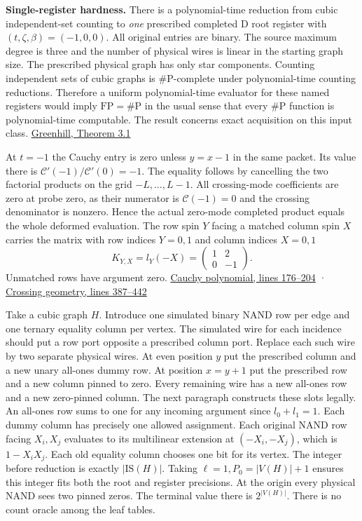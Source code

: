 \documentclass[
  11pt,
]{article}
\begin{document}
\textbf{Single-register hardness.} There is a polynomial-time reduction
from cubic independent-set counting to \emph{one} prescribed completed D
root register with \((t,\zeta,\beta)=(-1,0,0)\). All original entries
are binary. The source maximum degree is three and the number of
physical wires is linear in the starting graph size. The prescribed
physical graph has only star components. Counting independent sets of
cubic graphs is \(\#\mathrm P\)-complete under polynomial-time counting
reductions. Therefore a uniform polynomial-time evaluator for these
named registers would imply \(\mathrm{FP}=\#\mathrm P\) in the usual
sense that every \(\#\mathrm P\) function is polynomial-time computable.
The result concerns exact acquisition on this input class.
\href{https://web.maths.unsw.edu.au/~csg/papers/complexity.pdf}{Greenhill,
Theorem 3.1}

At \(t=-1\) the Cauchy entry is zero unless \(y=x-1\) in the same
packet. Its value there is \(\mathcal C'(-1)/\mathcal C'(0)=-1\). The
equality follows by cancelling the two factorial products on the grid
\(-L,\ldots,L-1\). All crossing-mode coefficients are zero at probe
zero, as their numerator is \(\mathcal C(-1)=0\) and the crossing
denominator is nonzero. Hence the actual zero-mode completed product
equals the whole deformed evaluation. The row spin \(Y\) facing a
matched column spin \(X\) carries the matrix with row indices \(Y=0,1\)
and column indices \(X=0,1\) \[
             K_{Y,X}=l_Y(-X)=
             \begin{pmatrix}1&2\\0&-1\end{pmatrix}.
\tag{A1}
\] Unmatched rows have argument zero.
\href{https://github.com/openai/math/blob/main/preprints/The-Exponential-Time-Hypothesis-is-False-October-25-2026/build/quantitative-contraction.tex\#L176}{Cauchy
polynomial, lines 176--204} ·
\href{https://github.com/openai/math/blob/main/preprints/The-Exponential-Time-Hypothesis-is-False-October-25-2026/build/quantitative-contraction.tex\#L387}{Crossing
geometry, lines 387--442}

Take a cubic graph \(H\). Introduce one simulated binary NAND row per
edge and one ternary equality column per vertex. The simulated wire for
each incidence should put a row port opposite a prescribed column port.
Replace each such wire by two separate physical wires. At even position
\(y\) put the prescribed column and a new unary all-ones dummy row. At
position \(x=y+1\) put the prescribed row and a new column pinned to
zero. Every remaining wire has a new all-ones row and a new zero-pinned
column. The next paragraph constructs these slots legally. An all-ones
row sums to one for any incoming argument since \(l_0+l_1=1\). Each
dummy column has precisely one allowed assignment. Each original NAND
row facing \(X_i,X_j\) evaluates to its multilinear extension at
\((-X_i,-X_j)\), which is \(1-X_iX_j\). Each old equality column chooses
one bit for its vertex. The integer before reduction is exactly
\(|\mathrm{IS}(H)|\). Taking \(\ell=1, P_0=|V(H)|+1\) ensures this
integer fits both the root and register precisions. At the origin every
physical NAND sees two pinned zeros. The terminal value there is
\(2^{|V(H)|}\). There is no count oracle among the leaf tables.
\end{document}
